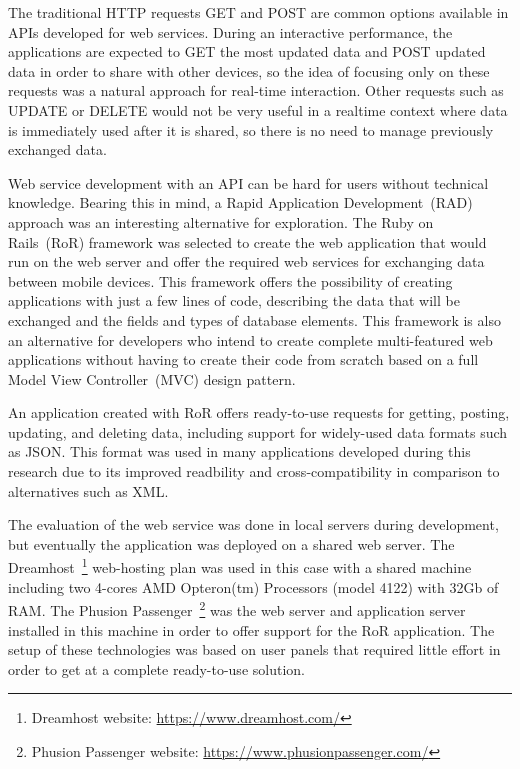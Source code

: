 
The traditional HTTP requests GET and POST are common options available in APIs developed for web services.
During an interactive performance, the applications are expected to GET the most updated data and POST updated data in order to share with other devices, so the idea of focusing only on these requests was a natural approach for real-time interaction.
Other requests such as UPDATE or DELETE would not be very useful in a realtime context where data is immediately used after it is shared, so there is no need to manage previously exchanged data.

Web service development with an API can be hard for users without technical knowledge.
Bearing this in mind, a Rapid Application Development~(RAD) approach was an interesting alternative for exploration.
The Ruby on Rails~(RoR) framework was selected to create the web application that would run on the web server and offer the required web services for exchanging data between mobile devices.
This framework offers the possibility of creating applications with just a few lines of code, describing the data that will be exchanged and the fields and types of database elements.
This framework is also an alternative for developers who intend to create complete multi-featured web applications without having to create their code from scratch based on a full Model View Controller~(MVC) design pattern.

An application created with RoR offers ready-to-use requests for getting, posting, updating, and deleting data, including support for widely-used data formats such as JSON.
This format was used in many applications developed during this research due to its improved readbility and cross-compatibility in comparison to alternatives such as XML.

The evaluation of the web service was done in local servers during development, but eventually the application was deployed on a shared web server.
The Dreamhost~\footnote{Dreamhost website: \url{https://www.dreamhost.com/}} web-hosting plan was used in this case with a shared machine including two 4-cores AMD Opteron(tm) Processors (model 4122) with 32Gb of RAM. 
The Phusion Passenger~\footnote{Phusion Passenger website: \url{https://www.phusionpassenger.com/}} was the web server and application server installed in this machine in order to offer support for the RoR application.
The setup of these technologies was based on user panels that required little effort in order to get at a complete ready-to-use solution.


